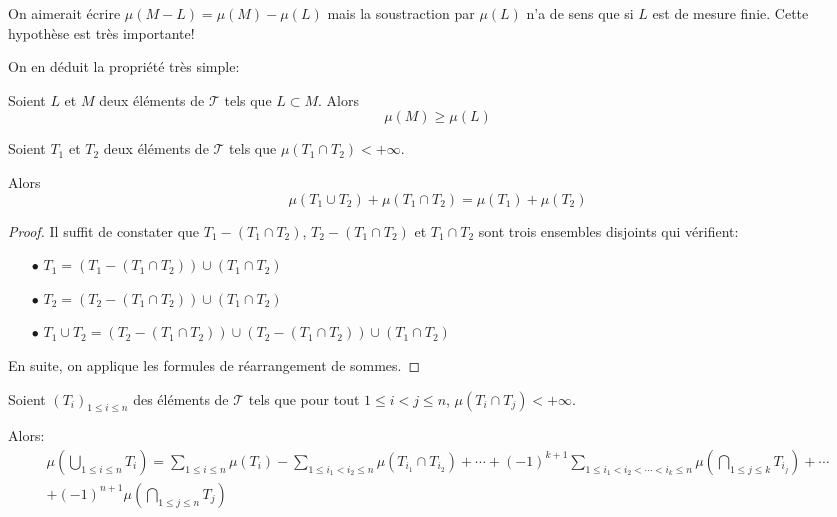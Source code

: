 \begin{nota}
On aimerait écrire $\mu(M-L)=\mu(M)-\mu(L)$ mais la soustraction par $\mu(L)$ n'a de sens que si $L$ est de mesure finie. Cette hypothèse est très importante!
\end{nota}

On en déduit la propriété très simple:

\begin{prop}[Inclusion]
Soient $L$ et $M$ deux éléments de $\mathcal{T}$ tels que $L \subset M$. Alors
\[
\mu(M) \geq  \mu(L)
\]
\end{prop}

\begin{prop}
Soient $T_1$ et $T_2$ deux éléments de $\mathcal{T}$ tels que $\mu\left(T_1 \cap T_2\right)<+\infty$. 

Alors
\[
\mu\left(T_1 \cup T_2\right)+\mu\left(T_1 \cap T_2\right)=\mu(T_1)+\mu(T_2)
\]
\end{prop}

\begin{proof}
Il suffit de constater que $T_1-\left(T_1 \cap T_2\right)$, $T_2-\left(T_1 \cap T_2\right)$ et $T_1 \cap T_2$ sont trois ensembles disjoints qui vérifient:

\begin{itemize}
\item[$\bullet$] $T_1=\left(T_1-\left(T_1 \cap T_2\right)\right) \cup \left(T_1 \cap T_2\right)$
\item[$\bullet$] $T_2=\left(T_2-\left(T_1 \cap T_2\right)\right) \cup \left(T_1 \cap T_2\right)$
\item[$\bullet$] $T_1 \cup T_2 =\left(T_2-\left(T_1 \cap T_2\right)\right) \cup \left(T_2-\left(T_1 \cap T_2\right)\right) \cup \left(T_1 \cap T_2\right)$
\end{itemize}

En suite, on applique les formules de réarrangement de sommes.
\end{proof}

\begin{prop}
Soient $\left(T_i\right)_{1 \leq i \leq n}$  des éléments de $\mathcal{T}$ tels que pour tout $1 \leq i < j \leq n$, $\mu\left(T_i \cap T_j\right)<+\infty$. 

Alors:
\begin{multline*}
\mu\left(\bigcup \limits_{1 \leq i \leq n} T_i\right) = \displaystyle{\sum \limits_{1 \leq i \leq n}} \mu(T_i) - \displaystyle{\sum \limits_{1 \leq i_1 < i_2 \leq n}} \mu\left(T_{i_1} \cap T_{i_2}\right) + \cdots + (-1)^{k+1} \displaystyle{\sum \limits_{1 \leq i_1 < i_2 < \cdots < i_k \leq n}} \mu\left( \bigcap \limits_{1 \leq j \leq k} T_{i_j} \right) + \cdots \\
+ (-1)^{n+1} \mu\left( \bigcap \limits_{1 \leq j \leq n} T_j \right)
\end{multline*}
\end{prop}

